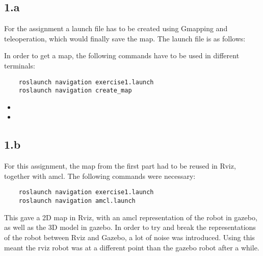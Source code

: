 
\subsection*{1.a}
For the assignment a launch file has to be created using Gmapping and teleoperation, which would finally save the map. The launch file is as follows:



In order to get a map, the following commands have to be used in different terminals:

\begin{lstlisting}
	roslaunch navigation exercise1.launch
	roslaunch navigation create_map
\end{lstlisting}

\begin{itemize}
	\item {}
	\item {}
\end{itemize}



\subsection*{1.b}


For this assignment, the map from the first part had to be reused in Rviz, together with amcl. The following commands were necessary:

\begin{lstlisting}
	roslaunch navigation exercise1.launch
	roslaunch navigation amcl.launch
\end{lstlisting}

This gave a 2D map in Rviz, with an amcl representation of the robot in gazebo, as well as the 3D model in gazebo. In order to try and break the representations of the robot between Rviz and Gazebo, a lot of noise was introduced. Using this meant the rviz robot was at a different point than the gazebo robot after a while.



